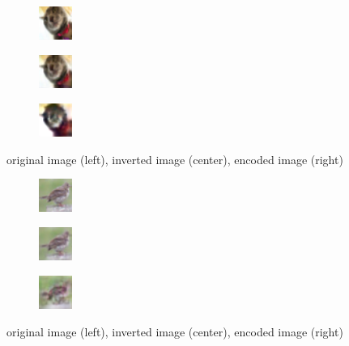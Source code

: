 \documentclass[nohyperref]{article}
\theoremstyle{plain}
\theoremstyle{definition}
\theoremstyle{remark}
\begin{document}
\begin{figure}[ht]
    \centering
    \begin{subfigure}{ }
        \includegraphics[width=0.12\textwidth]{inversion_images/original_17243_3.png}
    \end{subfigure}
    \begin{subfigure}{ }
        \includegraphics[width=0.12\textwidth]{inversion_images/inversion_17243_3.png}
    \end{subfigure}
    \begin{subfigure}{ }
        \includegraphics[width=0.12\textwidth]{inversion_images/encoder_17243_3.png}
    \end{subfigure}
    \caption{original image (left), inverted image (center), encoded image (right)}
    \label{inv2}
\end{figure}

\begin{figure}[ht]
    \centering
    \begin{subfigure}{ }
        \includegraphics[width=0.12\textwidth]{inversion_images/original_43421_2.png}
    \end{subfigure}
    \begin{subfigure}{ }
        \includegraphics[width=0.12\textwidth]{inversion_images/inversion_43421_2.png}
    \end{subfigure}
    \begin{subfigure}{ }
        \includegraphics[width=0.12\textwidth]{inversion_images/encoder_43421_2.png}
    \end{subfigure}
    \caption{original image (left), inverted image (center), encoded image (right)}
    \label{inv3}
\end{figure}
\end{document}
